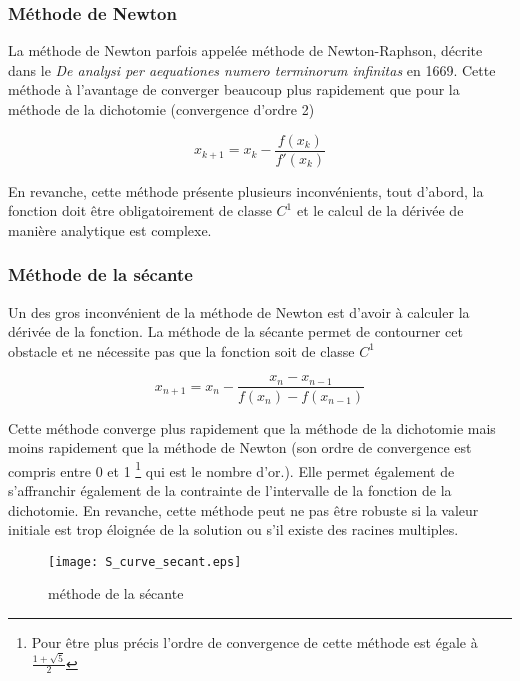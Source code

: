 \subsubsection{Méthode de Newton}
La méthode de Newton parfois appelée méthode de Newton-Raphson, décrite dans le \textit{De analysi per aequationes numero terminorum infinitas} en 1669. Cette méthode à l'avantage de converger beaucoup plus rapidement que pour la méthode de la dichotomie (convergence d'ordre 2)

\begin{equation}
x_{k+1} = x_k - \frac{f(x_k)}{f'(x_k)}
\end{equation}

En revanche, cette méthode présente plusieurs inconvénients, tout d'abord, la fonction doit être obligatoirement de classe $C^1$ et le calcul de la dérivée de manière analytique est complexe.


\subsubsection{Méthode de la sécante}

Un des gros inconvénient de la méthode de Newton est d'avoir à calculer la dérivée de la fonction. La méthode de la sécante permet de contourner cet obstacle et ne nécessite pas que la fonction soit de classe $C^1$

\begin{equation}
x_{n+1} = x_n - \frac{x_n - x_{n-1}}{f(x_n) - f(x_{n-1})}
\end{equation}

Cette méthode converge plus rapidement que la méthode de la dichotomie mais moins rapidement que la méthode de Newton (son ordre de convergence est compris entre 0 et 1 \footnote{Pour être plus précis l'ordre de convergence de cette méthode est égale à $\frac{1 + \sqrt{5}}{2}$} qui est le nombre d'or.). Elle permet également de s'affranchir également de la contrainte de l'intervalle de la fonction de la dichotomie. En revanche, cette méthode peut ne pas être robuste si la valeur initiale est trop éloignée de la solution ou s'il existe des racines multiples.

\begin{figure}[htb!]
	\centering
	\texttt{[image: S\_curve\_secant.eps]}
	\caption{méthode de la sécante}
	\label{Fig::bench}
\end{figure}


